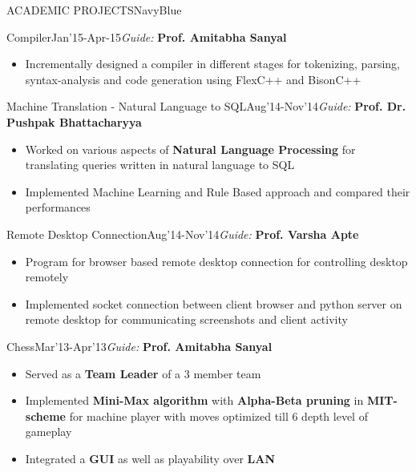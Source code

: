 \documentclass[11pt]{book} %
\begin{document}
\begin{ressection}{ACADEMIC PROJECTS}{NavyBlue}

\begin{ressubsection}{Compiler}{Jan'15-Apr-15}{\textit{Guide:} \textbf{Prof. Amitabha Sanyal}}
\begin{itemize}
\itemsep-0.1em
\item Incrementally designed a compiler in different stages for tokenizing, parsing, syntax-analysis and code generation using FlexC++ and BisonC++
\end{itemize}
\end{ressubsection}

\begin{ressubsection}{Machine Translation - Natural Language to SQL}{Aug'14-Nov'14}{\textit{Guide:} \textbf{Prof. Dr. Pushpak Bhattacharyya}}
\begin{itemize}
\itemsep-0.1em
\item Worked on various aspects of \textbf{Natural Language Processing} for translating queries written in natural language to SQL
\item Implemented Machine Learning and Rule Based approach and compared their performances
\end{itemize}
\end{ressubsection}

\begin{ressubsection}{Remote Desktop Connection}{Aug'14-Nov'14}{\textit{Guide:} \textbf{Prof. Varsha Apte}}
\begin{itemize}
\itemsep-0.1em
\item Program for browser based remote desktop connection for controlling desktop remotely
\item Implemented socket connection between client browser and python server on remote desktop for communicating screenshots and client activity
\end{itemize}
\end{ressubsection}

\pagebreak

\begin{ressubsection}{Chess}{Mar'13-Apr'13}{\textit{Guide:} \textbf{Prof. Amitabha Sanyal}}
\begin{itemize}
\itemsep-0.1em
\item Served as a \textbf{Team Leader} of a 3 member team
\item Implemented \textbf{Mini-Max algorithm} with \textbf{Alpha-Beta pruning} in \textbf{MIT-scheme} for machine player with 
moves optimized till 6 depth level of gameplay
\item Integrated a \textbf{GUI} as well as playability over \textbf{LAN}
\end{itemize}
\end{ressubsection}


\end{ressection}
\end{document}
